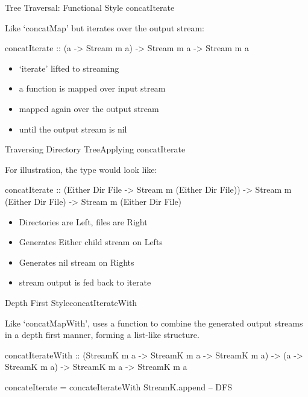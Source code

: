 \documentclass[17pt]{beamer}
\begin{document}
\begin{frame}[fragile]{Tree Traversal: Functional Style }{concatIterate}

Like `concatMap' but iterates over the output stream:
\begin{code}
concatIterate
  :: (a -> Stream m a) -> Stream m a -> Stream m a
\end{code}

\begin{itemize}
  \item `iterate' lifted to streaming
  \item a function is mapped over input stream
  \item mapped again over the output stream
  \item until the output stream is nil
\end{itemize}
\end{frame}

\begin{frame}[fragile]{Traversing Directory Tree}{Applying concatIterate}

For illustration, the type would look like:
\begin{code}
concatIterate
 :: (Either Dir File -> Stream m (Either Dir File))
 -> Stream m (Either Dir File)
 -> Stream m (Either Dir File)
\end{code}

\begin{itemize}
  \item Directories are Left, files are Right
  \item Generates Either child stream on Lefts
  \item Generates nil stream on Rights
  \item stream output is fed back to iterate
\end{itemize}
\end{frame}

%
%

\begin{frame}[fragile]{Depth First Style}{concatIterateWith}

Like `concatMapWith', uses a function to combine the generated output
streams in a depth first manner, forming a list-like structure.
\begin{code}
concatIterateWith
 :: (StreamK m a -> StreamK m a -> StreamK m a)
 -> (a -> StreamK m a)
 -> StreamK m a
 -> StreamK m a

concateIterate = concateIterateWith StreamK.append -- DFS
\end{code}
\end{frame}
\end{document}
